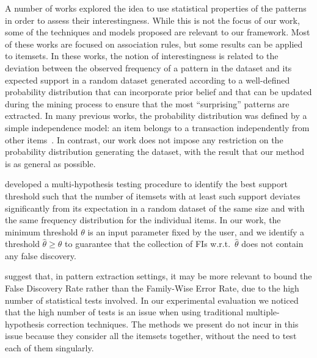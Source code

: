 A number of works explored the idea to use statistical properties of the
patterns in order to assess their interestingness. While this is not the focus of our work,
some of the techniques and models proposed are relevant to our framework.
Most of these works are
focused on association rules, but some results can be applied to itemsets. In
these works, the notion of interestingness is related to the deviation between
the observed frequency of a pattern in the dataset and its expected support in a
random dataset generated according to a well-defined probability distribution that can incorporate
prior belief and that can be updated during the mining process to ensure that
the most ``surprising'' patterns are extracted. In many previous works, the
probability distribution was defined by a simple independence model: an item belongs to a
transaction independently from other
items~\citep{SilversteinBM98,MegiddoS98,DuMouchelP01,GionisMMT07,Hamalainen10,KirschMAPUV12}.
In contrast, our work does not impose any
restriction on the probability distribution generating the dataset, with the result that our method is as general as
possible.

\citet{KirschMAPUV12} developed a multi-hypothesis
testing procedure to identify the best support threshold such that the number of
itemsets with at least such support deviates significantly from its expectation
in a random dataset of the same size and with the same frequency distribution
for the individual items. In our work, the minimum threshold $\theta$ is an input
parameter fixed by the user, and we identify a threshold $\hat{\theta}\ge\theta$
to guarantee that the collection of FIs w.r.t.~$\hat{\theta}$ does not contain
any false discovery.

\iffalse
\citet{BoltonHA02} suggest that, in pattern extraction settings,
it may be more relevant to bound the False Discovery Rate rather
than the Family-Wise Error Rate, due to the high number of statistical tests
involved. In our experimental evaluation we noticed that the high number of
tests is an issue when using traditional multiple-hypothesis correction
techniques. The methods we present do not incur in this issue because they
consider all the itemsets together, without the need to test each of them
singularly. 

